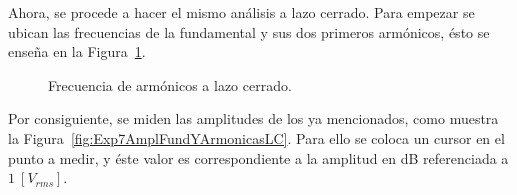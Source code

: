       Ahora, se procede a hacer el mismo análisis a lazo cerrado. Para empezar se ubican las frecuencias 
      de la fundamental y sus dos primeros armónicos, ésto se enseña en la Figura~\ref{fig:Exp7FrecLazoCerrado}.

      \begin{figure}[H]
        \centering
          \caption{Frecuencia de armónicos a lazo cerrado.}
          \label{fig:Exp7FrecLazoCerrado}
      \end{figure}

      Por consiguiente, se miden las amplitudes de los ya mencionados, como muestra la 
      Figura~\ref{fig:Exp7AmplFundYArmonicasLC}. Para ello se coloca un cursor en el punto 
      a medir, y éste valor es correspondiente a la amplitud en dB referenciada a $1~[V_{rms}]$.

